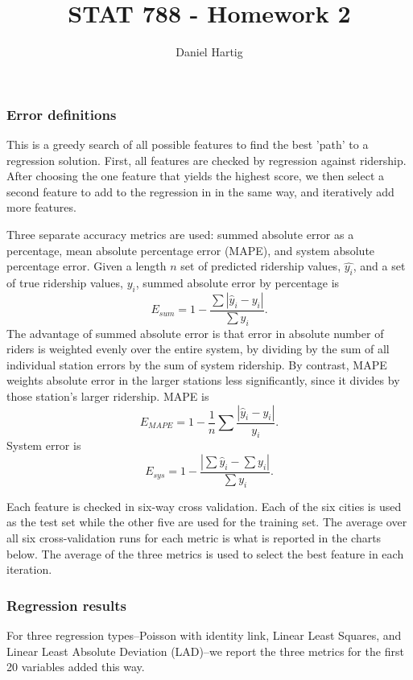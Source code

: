 \documentclass{article}
\title{STAT 788 - Homework 2}
\author{Daniel Hartig}
\begin{document}
\subsubsection*{Error definitions}

This is a greedy search of all possible features to find the best 'path' to a regression solution. First, all features are checked by regression against ridership. After choosing the one feature that yields the highest score, we then select a second feature to add to the regression in in the same way, and iteratively add more features.

Three separate accuracy metrics are used: summed absolute error as a percentage, mean absolute percentage error (MAPE), and system absolute percentage error. Given a length $n$ set of predicted ridership values, $\hat{y_i}$, and a set of true ridership values, $y_i$, summed absolute error by percentage is 
$$E_{sum} = 1 - \frac{\sum|\hat{y}_i-y_i|}{\sum y_i}.$$ The advantage of summed absolute error is that error in absolute number of riders is weighted evenly over the entire system, by dividing by the sum of all individual station errors by the sum of system ridership. By contrast, MAPE weights absolute error in the larger stations less significantly, since it divides by those station's larger ridership. MAPE is
$$E_{MAPE} = 1 - \frac{1}{n}\sum \frac{|\hat{y}_i-y_i|}{y_i}.$$ System error is 
$$E_{sys} = 1 - \frac{\left|\sum \hat{y}_i - \sum y_i\right|}{\sum y_i}.$$

Each feature is checked in six-way cross validation. Each of the six cities is used as the test set while the other five are used for the training set. The average over all six cross-validation runs for each metric is what is reported in the charts below. The average of the three metrics is used to select the best feature in each iteration.



\subsubsection*{Regression results}

For three regression types--Poisson with identity link, Linear Least Squares, and Linear Least Absolute Deviation (LAD)--we report the three metrics for the first 20 variables added this way. 
\end{document}

